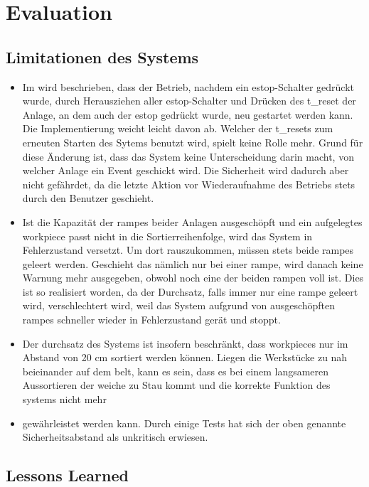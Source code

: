 \chapter{Evaluation}\label{ch:evaluation}



\section{Limitationen des Systems}\label{sec:limitations}

\begin{itemize}
    \item Im  wird beschrieben, dass der Betrieb, nachdem ein \gls{estop}-Schalter gedrückt wurde,
    durch Herausziehen aller \gls{estop}-Schalter und Drücken des \gls{t_reset}
    der Anlage, an dem auch der \gls{estop} gedrückt wurde, neu gestartet werden kann.
    Die Implementierung weicht leicht davon ab.
    Welcher der \glspl{t_reset} zum erneuten Starten des Sytems benutzt wird, spielt keine Rolle mehr.
    Grund für diese Änderung ist, dass das System keine Unterscheidung darin macht, von welcher Anlage ein Event geschickt wird.
    Die Sicherheit wird dadurch aber nicht gefährdet, da die letzte Aktion vor Wiederaufnahme des Betriebs
    stets durch den Benutzer geschieht.
    \item Ist die Kapazität der \glspl{rampe} beider Anlagen ausgeschöpft und ein aufgelegtes
    \gls{workpiece} passt nicht in die Sortierreihenfolge, wird das System in Fehlerzustand versetzt.
    Um dort rauszukommen, müssen stets beide \glspl{rampe} geleert werden.
    Geschieht das nämlich nur bei einer \gls{rampe}, wird danach keine Warnung mehr ausgegeben,
    obwohl noch eine der beiden \gls{rampe}n voll ist.
    Dies ist so realisiert worden, da der Durchsatz, falls immer nur eine \gls{rampe} geleert wird,
    verschlechtert wird, weil das System aufgrund von ausgeschöpften \glspl{rampe} schneller wieder in Fehlerzustand gerät und
    stoppt.
    \item Der \gls{durchsatz} des Systems ist insofern beschränkt, dass \glspl{workpiece} nur im
    Abstand von 20 cm sortiert werden können.
    Liegen die Werkstücke zu nah beieinander auf dem \gls{belt}, kann es sein, dass es bei einem langsameren Aussortieren
    der \gls{weiche} zu Stau kommt und die korrekte Funktion des \gls{system}s nicht mehr \item
    gewährleistet werden kann.
    Durch einige Tests hat sich der oben genannte Sicherheitsabstand als unkritisch erwiesen.
\end{itemize}


\section{Lessons Learned}\label{sec:lessons-learned}